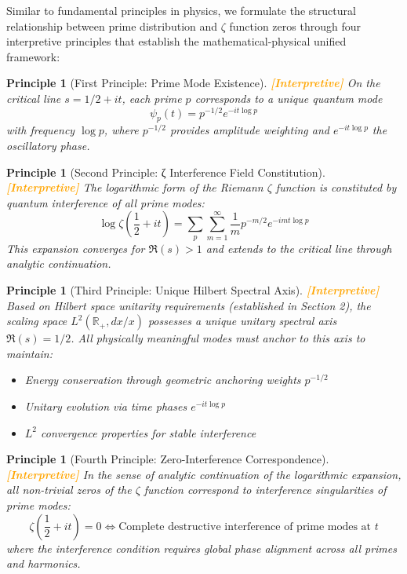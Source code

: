 \documentclass[12pt]{article}
\theoremstyle{plain}
\newtheorem{principle}[theorem]{Principle}
\theoremstyle{definition}
\newcommand{\statusinterp}{\textcolor{orange}{\textbf{[Interpretive]}}}
\begin{document}
Similar to fundamental principles in physics, we formulate the structural relationship between prime distribution and $\zeta$ function zeros through four interpretive principles that establish the mathematical-physical unified framework:

\begin{principle}[First Principle: Prime Mode Existence] \statusinterp
On the critical line $s = 1/2 + it$, each prime $p$ corresponds to a unique quantum mode
$$\psi_p(t) = p^{-1/2} e^{-it\log p}$$
with frequency $\log p$, where $p^{-1/2}$ provides amplitude weighting and $e^{-it\log p}$ the oscillatory phase.
\end{principle}

\begin{principle}[Second Principle: ζ Interference Field Constitution] \statusinterp
The logarithmic form of the Riemann $\zeta$ function is constituted by quantum interference of all prime modes:
$$\log\zeta\left(\frac{1}{2}+it\right) = \sum_{p}\sum_{m=1}^{\infty} \frac{1}{m} p^{-m/2} e^{-imt\log p}$$
This expansion converges for $\Re(s) > 1$ and extends to the critical line through analytic continuation.
\end{principle}

\begin{principle}[Third Principle: Unique Hilbert Spectral Axis] \statusinterp
Based on Hilbert space unitarity requirements (established in Section 2), the scaling space $L^2(\mathbb{R}_+, dx/x)$ possesses a unique unitary spectral axis $\Re(s) = 1/2$. All physically meaningful modes must anchor to this axis to maintain:
\begin{itemize}
\item Energy conservation through geometric anchoring weights $p^{-1/2}$
\item Unitary evolution via time phases $e^{-it\log p}$
\item $L^2$ convergence properties for stable interference
\end{itemize}
\end{principle}

\begin{principle}[Fourth Principle: Zero-Interference Correspondence] \statusinterp
In the sense of analytic continuation of the logarithmic expansion, all non-trivial zeros of the $\zeta$ function correspond to interference singularities of prime modes:
$$\zeta\left(\frac{1}{2}+it\right) = 0 \iff \text{Complete destructive interference of prime modes at } t$$
where the interference condition requires global phase alignment across all primes and harmonics.
\end{principle}
\end{document}
